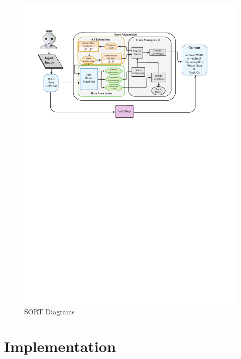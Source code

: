 \documentclass{CSSRforAfrica}
\begin{document}
\begin{figure}[!hbpt]
	\centering
	\includegraphics[scale=0.8]{images/SORT_Diagram.pdf}
	\caption{SORT Diagrams}
	\label{fig: SORT Diagrams}
\end{figure}

\newpage

\section{Implementation}
\end{document}
